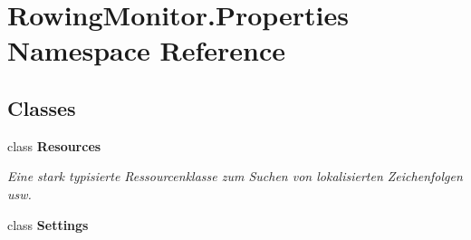 \hypertarget{namespace_rowing_monitor_1_1_properties}{}\section{Rowing\+Monitor.\+Properties Namespace Reference}
\label{namespace_rowing_monitor_1_1_properties}
\subsection*{Classes}
\begin{DoxyCompactItemize}
\item 
class {\bfseries Resources}
\begin{DoxyCompactList}\small\item\em Eine stark typisierte Ressourcenklasse zum Suchen von lokalisierten Zeichenfolgen usw. \end{DoxyCompactList}\item 
class {\bfseries Settings}
\end{DoxyCompactItemize}
